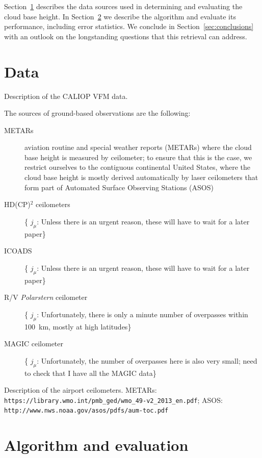 \documentclass[amt,manuscript]{copernicus}\usepackage[]{graphicx}\usepackage[]{color}
\newcommand{\hlnum}[1]{\textcolor[rgb]{0.686,0.059,0.569}{#1}}%
\newcommand\comment[2]{\{\hlnum{ \textit{#1}: #2}\}}
\newcommand\commentjm[1]{\comment{$j_\mu$}{#1}}
\begin{document}
Section~\ref{sec:data} describes the data sources used in determining and
evaluating the cloud base height.  In Section~\ref{sec:algorithm} we describe
the algorithm and evaluate its performance, including error statistics.  We
conclude in Section~\ref{sec:conclusions} with an outlook on the longstanding
questions that this retrieval can address.

\section{Data}
\label{sec:data}

Description of the CALIOP VFM data.

The sources of ground-based observations are the following:
\begin{description}
\item[METARs] aviation routine and special weather reports (METARs) where the
  cloud base height is measured by ceilometer; to ensure that this is the case,
  we restrict ourselves to the contiguous continental United States, where the
  cloud base height is mostly derived automatically by laser ceilometers that
  form part of Automated Surface Observing Stations (ASOS)
\item[HD(CP)$^2$ ceilometers] \commentjm{Unless there is an urgent reason, these
    will have to wait for a later paper}
\item[ICOADS] \commentjm{Unless there is an urgent reason, these
    will have to wait for a later paper}
\item[R/V \textit{Polarstern} ceilometer] \commentjm{Unfortunately, there is
    only a minute number of overpasses within 100~km, mostly at high latitudes}
\item[MAGIC ceilometer] \commentjm{Unfortunately, the number of overpasses here
    is also very small; need to check that I have all the MAGIC data}
\end{description}

Description of the airport ceilometers.  METARs:
\verb+https://library.wmo.int/pmb_ged/wmo_49-v2_2013_en.pdf+; ASOS:
\verb+http://www.nws.noaa.gov/asos/pdfs/aum-toc.pdf+ 

\section{Algorithm and evaluation}
\label{sec:algorithm}
\end{document}
